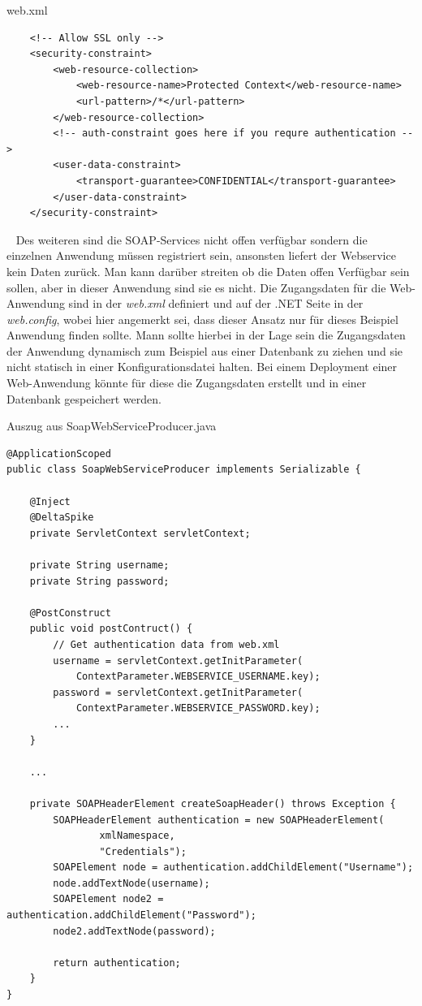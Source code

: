 \documentclass[11pt, a4paper, twoside]{article}   	%
\begin{document}
\begin{listing}[H]    
\caption{web.xml}    
\begin{verbatim}
	<!-- Allow SSL only -->
	<security-constraint>
		<web-resource-collection>
			<web-resource-name>Protected Context</web-resource-name>
			<url-pattern>/*</url-pattern>
		</web-resource-collection>
		<!-- auth-constraint goes here if you requre authentication -->
		<user-data-constraint>
			<transport-guarantee>CONFIDENTIAL</transport-guarantee>
		</user-data-constraint>
	</security-constraint>
\end{verbatim}
\end{listing}
\ \newline
Des weiteren sind die SOAP-Services nicht offen verfügbar sondern die einzelnen Anwendung müssen registriert sein, ansonsten liefert der Webservice kein Daten zurück. Man kann darüber streiten ob die Daten offen Verfügbar sein sollen, aber in dieser Anwendung sind sie es nicht. Die Zugangsdaten für die Web-Anwendung sind in der \emph{web.xml} definiert und auf der .NET Seite in der \emph{web.config}, wobei hier angemerkt sei, dass dieser Ansatz nur für dieses Beispiel Anwendung finden sollte. Mann sollte hierbei in der Lage sein die Zugangsdaten der Anwendung dynamisch zum Beispiel aus einer Datenbank zu ziehen und sie nicht statisch in einer Konfigurationsdatei halten. Bei einem Deployment einer Web-Anwendung könnte für diese die Zugangsdaten erstellt und in einer Datenbank gespeichert werden.
\newpage
\begin{listing}
\caption{Auszug aus SoapWebServiceProducer.java}
\begin{verbatim}
@ApplicationScoped
public class SoapWebServiceProducer implements Serializable {

	@Inject
	@DeltaSpike
	private ServletContext servletContext;

	private String username;
	private String password;

	@PostConstruct
	public void postContruct() {
		// Get authentication data from web.xml
		username = servletContext.getInitParameter(
			ContextParameter.WEBSERVICE_USERNAME.key);
		password = servletContext.getInitParameter(
			ContextParameter.WEBSERVICE_PASSWORD.key);
		...
	}
	
	...
	
	private SOAPHeaderElement createSoapHeader() throws Exception {
		SOAPHeaderElement authentication = new SOAPHeaderElement(
				xmlNamespace,
				"Credentials");
		SOAPElement node = authentication.addChildElement("Username");
		node.addTextNode(username);
		SOAPElement node2 = authentication.addChildElement("Password");
		node2.addTextNode(password);

		return authentication;
	}
}
\end{verbatim}
\end{listing} 
\end{document}
